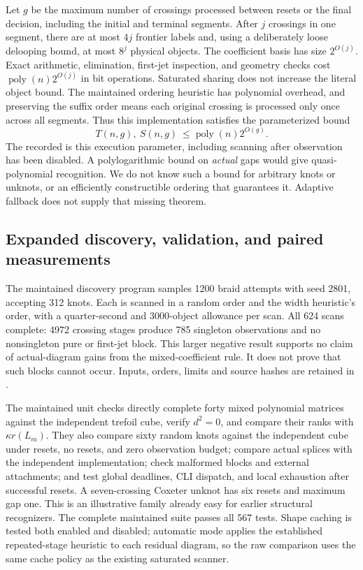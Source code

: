 Let $g$ be the maximum number of crossings processed between resets or
the final decision, including the initial and terminal segments.  After
$j$ crossings in one segment, there are at most $4j$ frontier labels and,
using a deliberately loose delooping bound, at most $8^j$ physical objects.
The coefficient basis has size $2^{O(j)}$.  Exact arithmetic, elimination,
first-jet inspection, and geometry checks cost
$\operatorname{poly}(n)2^{O(j)}$ in bit operations.  Saturated sharing
does not increase the literal object bound.  The maintained ordering
heuristic has polynomial overhead, and preserving the suffix order means
each original crossing is processed only once across all segments.
Thus this implementation satisfies the parameterized bound
\[
 T(n,g),\ S(n,g)\ \leq\operatorname{poly}(n)2^{O(g)}.
\]
The recorded  is this execution parameter, including
scanning after observation has been disabled.  A polylogarithmic bound
on \emph{actual} gaps would give quasi-polynomial recognition.  We do
not know such a bound for arbitrary knots or unknots, or an efficiently
constructible ordering that guarantees it.  Adaptive fallback does not
supply that missing theorem.

\subsection{Expanded discovery, validation, and paired measurements}

The maintained discovery program
 samples 1200 braid attempts
with seed 2801, accepting 312 knots.  Each is scanned in a random order
and the width heuristic's order, with a quarter-second and 3000-object
allowance per scan.  All 624 scans complete: 4972 crossing stages produce
785 singleton observations and no nonsingleton pure or first-jet block.
This larger negative result supports no claim of actual-diagram gains
from the mixed-coefficient rule.  It does not prove that such blocks
cannot occur.  Inputs, orders, limits and source hashes are retained in
.

The maintained unit checks directly complete forty mixed polynomial
matrices against the independent trefoil cube, verify $d^2=0$, and compare
their ranks with $\kappa r(L_m)$.  They also compare sixty random knots
against the independent cube under resets, no resets, and zero observation
budget; compare actual splices with the independent implementation;
check malformed blocks and external attachments; and test global deadlines,
CLI dispatch, and local exhaustion after successful resets.  A seven-crossing
Coxeter unknot has six resets and maximum gap one.  This is an illustrative
family already easy for earlier structural recognizers.
The complete maintained suite passes all 567 tests.  Shape caching is tested
both enabled and disabled; automatic mode applies the established repeated-stage
heuristic to each residual diagram, so the raw comparison uses the same cache
policy as the existing saturated scanner.

